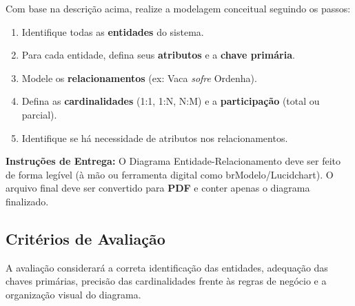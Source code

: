 Com base na descrição acima, realize a modelagem conceitual seguindo os passos:
\begin{enumerate}
    \item Identifique todas as \textbf{entidades} do sistema.
    \item Para cada entidade, defina seus \textbf{atributos} e a \textbf{chave primária}.
    \item Modele os \textbf{relacionamentos} (ex: Vaca \textit{sofre} Ordenha).
    \item Defina as \textbf{cardinalidades} (1:1, 1:N, N:M) e a \textbf{participação} (total ou parcial).
    \item Identifique se há necessidade de atributos nos relacionamentos.
\end{enumerate}

\begin{observacao}
\textbf{Instruções de Entrega:}
O Diagrama Entidade-Relacionamento deve ser feito de forma legível (à mão ou ferramenta digital como brModelo/Lucidchart). O arquivo final deve ser convertido para \textbf{PDF} e conter apenas o diagrama finalizado.
\end{observacao}

\subsection{Critérios de Avaliação}
A avaliação considerará a correta identificação das entidades, adequação das chaves primárias, precisão das cardinalidades frente às regras de negócio e a organização visual do diagrama.

\vspace{0.5cm}

